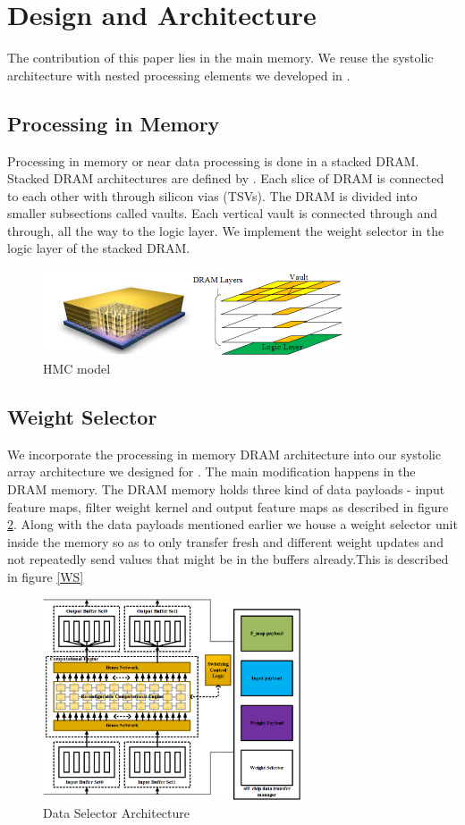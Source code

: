 \documentclass[conference]{IEEEtran}
\begin{document}
\section{Design and Architecture}
The contribution of this paper lies in the main memory. We reuse the systolic architecture with nested processing elements we developed in \cite{Ansari_eff}.


\subsection{Processing in Memory}
Processing in memory or near data processing is done in a stacked DRAM. Stacked DRAM architectures are defined by \cite{standard2013high, black2013hybrid}. Each slice of DRAM is connected to each other with through silicon vias (TSVs). The DRAM is divided into smaller subsections called vaults. Each vertical vault is connected through and through, all the way to the logic layer. We implement the weight selector in the logic layer of the stacked DRAM. 
\begin{figure}[H]
\centering
\includegraphics[width=3.5in]{HMC}
\caption{HMC model}
\label{HMC}
\end{figure}


\subsection{Weight Selector}

We incorporate the processing in memory DRAM architecture into our systolic array architecture we designed for \cite{Ansari_eff}. The main modification happens in the DRAM memory. The DRAM memory holds three kind of data payloads - input feature maps, filter weight kernel and output feature maps as described in figure \ref{arch}. Along with the data payloads mentioned earlier we house a weight selector unit inside the memory so as to only transfer fresh and different weight updates and not repeatedly send values that might be in the buffers already.This is described in figure \ref{WS}
\begin{figure}[!ht]
\centering
\includegraphics[width=3in]{arch}
\caption{Data Selector Architecture}
\label{arch}
\end{figure}
\end{document}
